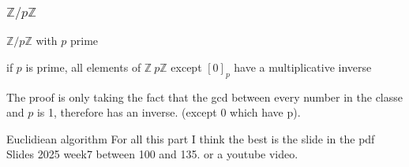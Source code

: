 \subsubsection{$\mathbb{Z}/ p\mathbb{Z}$}
\begin{parag}{$\mathbb{Z}/ p \mathbb{Z}$ with $p$ prime}
   \begin{theorem}
       if $p$ is prime, all elements of $\mathbb{Z} \ p \mathbb{Z}$ except $\left[0\right]_p$ have a multiplicative inverse
   \end{theorem} 
   The proof is only taking the fact that the gcd between every number in the classe and $p$ is 1, therefore has an inverse. (except 0 which have p).
\end{parag}
\begin{parag}{Euclidiean algorithm}
    For all this part I think the best is the slide in the pdf Slides 2025 week7 between 100 and 135. or a youtube video.
    
\end{parag}



